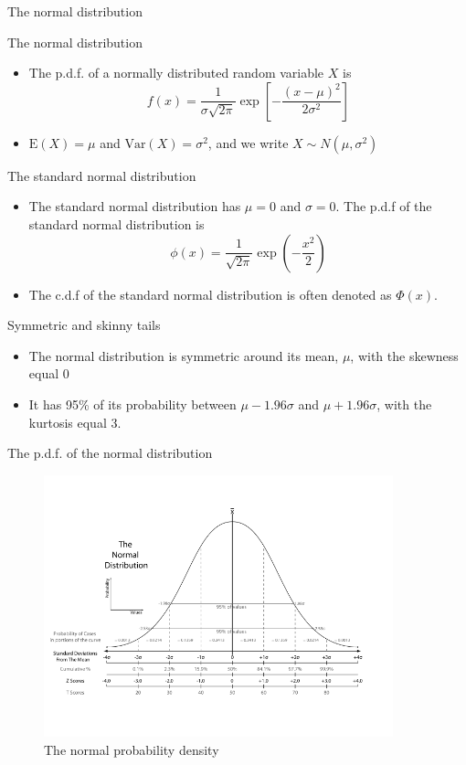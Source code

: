 \documentclass[presentation]{beamer}
\begin{document}
\begin{frame}[label={sec:org5dac612}]{The normal distribution}
\begin{block}{The normal distribution}
\begin{itemize}
\item The p.d.f. of a normally distributed random variable \(X\) is
\[ f(x) =
  \frac{1}{\sigma\sqrt{2\pi}}\exp\left[-\frac{(x-\mu)^{2}}{2\sigma^{2}}\right]
  \]
\item \(\mathrm{E}(X) = \mu\) and \(\mathrm{Var}(X) = \sigma^{2}\), and we write \(X \sim N(\mu, \sigma^{2})\)
\end{itemize}
\end{block}

\begin{block}{The standard normal distribution}
\begin{itemize}
\item The standard normal distribution has \(\mu = 0\) and \(\sigma = 0\). The p.d.f of the
standard normal distribution is
\[
  \phi(x) = \frac{1}{\sqrt{2\pi}}\exp\left(-\frac{x^2}{2}\right)
  \]
\item The c.d.f of the standard normal distribution is often denoted as
\(\Phi(x)\).
\end{itemize}
\end{block}
\end{frame}

\begin{frame}[label={sec:org332b786}]{Symmetric and skinny tails}
\begin{itemize}
\item The normal distribution is symmetric around its mean, \(\mu\), with the
skewness equal 0
\item It has 95\% of its probability between
\(\mu-1.96\sigma\) and \(\mu+1.96\sigma\), with the kurtosis
equal 3.
\end{itemize}
\end{frame}

\begin{frame}[label={sec:org7c9c46d}]{The p.d.f. of the normal distribution}
\begin{figure}[htbp]
\centering
\includegraphics[width=0.9\textwidth]{figure/Normal-distribution-curve.png}
\caption{\label{fig:orgf54fb72}
The normal probability density}
\end{figure}
\end{frame}
\end{document}
